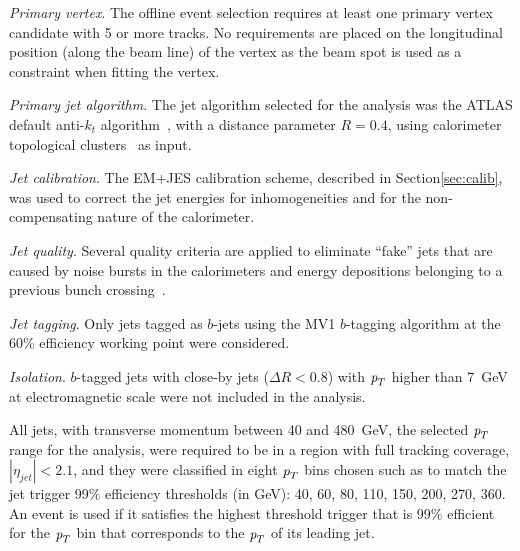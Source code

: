 \vspace{5 mm}
\emph{Primary vertex}.  The offline event selection requires at least one primary vertex candidate with 5 or more tracks.  No requirements are placed on the longitudinal position (along the beam line) of the vertex as the beam spot is used as a constraint when fitting the vertex. 

\vspace{5 mm}
\emph{Primary jet algorithm}. The jet algorithm selected for the analysis was the ATLAS default anti-$k_t$ algorithm~\cite{antiktalg}, with a distance parameter $R = 0.4$, using calorimeter topological clusters~\cite{topoClusters} as input.

\vspace{5 mm}
\emph{Jet calibration}.  The EM+JES calibration scheme, described in Section\ref{sec:calib}, was used to correct the jet energies for inhomogeneities and for the non-compensating nature of the calorimeter.

\vspace{5 mm}
\emph{Jet quality}.  Several quality criteria are applied to eliminate ``fake'' jets that are caused by noise bursts in the calorimeters and energy depositions belonging to a previous bunch crossing~\cite{ATLAS-CONF-2012-020}.

\vspace{5 mm}
\emph{Jet tagging}.  Only jets tagged as $b$-jets using the MV1 $b$-tagging algorithm at the 60\% efficiency working point were considered.

\vspace{5 mm}
\emph{Isolation}.  $b$-tagged jets with close-by jets ($\Delta R < 0.8$) with ${\emph{p}_{T}}$ higher than 7~GeV at electromagnetic scale were not included in the analysis.

\vspace{5 mm}
All jets, with transverse momentum between 40 and 480~GeV,  the selected ${\emph{p}_{T}}$ range for the analysis, were required to be in a region with full tracking coverage, $|\eta_{jet}|<2.1$, and they were classified in eight ${\emph{p}_{T}}$ bins chosen such as to match the jet trigger 99\% efficiency thresholds (in GeV): 40, 60, 80, 110, 150, 200, 270, 360. An event is used if it satisfies the highest threshold trigger that is 99\% efficient for the ${\emph{p}_{T}}$ bin that corresponds to the ${\emph{p}_{T}}$ of its leading jet.

